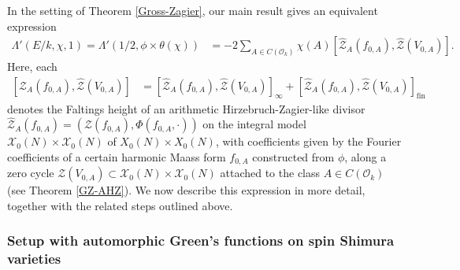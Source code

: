 \documentclass{amsart}
\theoremstyle{definition}
\theoremstyle{definition}
\theoremstyle{definition}
\begin{document}
In the setting of Theorem \ref{Gross-Zagier}, our main result gives an equivalent expression
\begin{equation*}\begin{aligned} \Lambda'(E/k, \chi, 1) = \Lambda'(1/2, \phi \times \theta(\chi)) 
&= -2 \sum\limits_{A \in C(\mathcal{O}_k)} \chi (A) \left[ \widehat{\mathcal{Z}}_A(f_{0,A}), \widehat{\mathcal{Z}}(V_{0,A}) \right]. \end{aligned}\end{equation*}
Here, each 
\begin{align*} \left[ \widehat{\mathcal{Z}}_A(f_{0,A}), \widehat{\mathcal{Z}}(V_{0,A}) \right] &= \left[ \widehat{\mathcal{Z}}_A(f_{0,A}), \widehat{\mathcal{Z}}(V_{0,A}) \right]_{\infty}
+ \left[ \widehat{\mathcal{Z}}_A(f_{0,A}), \widehat{\mathcal{Z}}(V_{0,A}) \right]_{\operatorname{fin}} \end{align*}
denotes the Faltings height of an arithmetic Hirzebruch-Zagier-like divisor $\widehat{\mathcal{Z}}_A(f_{0,A}) = (\mathcal{Z}(f_{0,A}), \Phi(f_{0,A}, \cdot))$ on 
the integral model $\mathcal{X}_0(N) \times \mathcal{X}_0(N)$ of $X_0(N) \times X_0(N)$, with coefficients given by the Fourier coefficients of a certain harmonic Maass form $f_{0,A}$ constructed from $\phi$,
along a zero cycle $\mathcal{Z}(V_{0,A}) \subset \mathcal{X}_0(N) \times \mathcal{X}_0(N)$ attached to the class $A \in C(\mathcal{O}_k)$ (see Theorem \ref{GZ-AHZ}).
We now describe this expression in more detail, together with the related steps outlined above.

\subsubsection{Setup with automorphic Green's functions on spin Shimura varieties}
\end{document}
